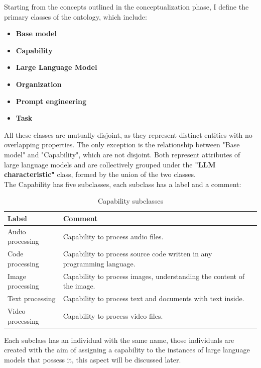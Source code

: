 Starting from the concepts outlined in the conceptualization phase, I define the primary classes of the ontology, which include:
\begin{itemize}
    \item \textbf{Base model}

    \item \textbf{Capability}

    \item \textbf{Large Language Model}

    \item \textbf{Organization}

    \item \textbf{Prompt engineering}

    \item \textbf{Task}
\end{itemize}
All these classes are mutually disjoint, as they represent distinct entities with no overlapping properties. The only exception is the relationship between "Base model" and "Capability", which are not disjoint. Both represent attributes of large language models and are collectively grouped under the \textbf{"LLM characteristic"} class, formed by the union of the two classes. \\
The Capability has five subclasses, each subclass has a label and a comment:
\begin{table}[H]
    \centering
    \begin{tabular}{|>{\raggedright\arraybackslash}p{6cm}|>{\raggedright\arraybackslash}p{6cm}|}
        \hline
        \textbf{Label} & \textbf{Comment} \\ \hline
         Audio processing &  Capability to process audio files. \\ \hline
         
         Code processing & Capability to process source code written in any programming language. \\ \hline
         
         Image processing & Capability to process images, understanding the content of the image. \\ \hline
         
         Text processing & Capability to process text and documents with text inside. \\ \hline
         
         Video processing & Capability to process video files. \\ \hline
    \end{tabular}
    \caption{Capability subclasses}
\end{table}
Each subclass has an individual with the same name, those individuals are created with the aim of assigning a capability to the instances of large language models that possess it, this aspect will be discussed later.

